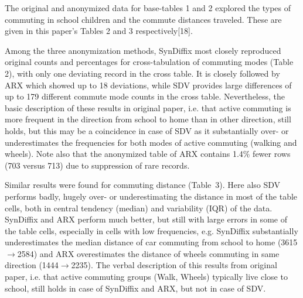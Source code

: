\documentclass[10pt]{article}
\newcommand{\mycite}[1]{[#1]}
\begin{document}
      \setlength{\fboxsep}{3pt}


The original and anonymized data for base-tables 1 and 2 explored the types of commuting in school children and the commute distances traveled. These are given in this paper's Tables 2 and 3 respectively\mycite{18}. 

Among the three anonymization methods, SynDiffix most closely reproduced original counts and percentages for cross-tabulation of commuting modes (Table 2), with only one deviating record in the cross table. It is closely followed by ARX which showed up to 18 deviations, while SDV provides large differences of up to 179 different commute mode counts in the cross table. Nevertheless, the basic description of these results in original paper, i.e. that active commuting is more frequent in the direction from school to home than in other direction, still holds, but this may be a coincidence in case of SDV as it substantially over- or underestimates the frequencies for both modes of active commuting (walking and wheels). Note also that the anonymized table of ARX contains 1.4\% fewer rows (703 versus 713) due to suppression of rare records.

Similar results were found for commuting distance (Table~3). Here also SDV performs badly, hugely over- or underestimating the distance in most of the table cells, both in central tendency (median) and variability (IQR) of the data. SynDiffix and ARX perform much better, but still with large errors in some of the table cells, especially in cells with low frequencies, e.g. SynDiffix substantially underestimates the median distance of car commuting from school to home (3615$\rightarrow$2584) and ARX overestimates the distance of wheels commuting in same direction (1444$\rightarrow$2235). The verbal description of this results from original paper, i.e. that active commuting groups (Walk, Wheels) typically live
close to school, still holds in case of SynDiffix and ARX, but not in case of SDV.

%
%
%
\end{document}
